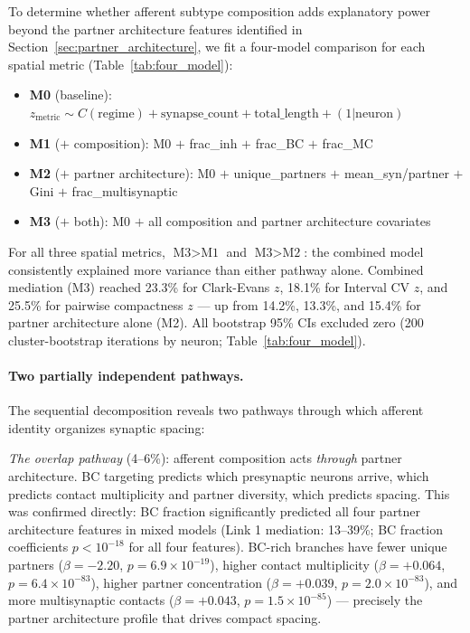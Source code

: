 \documentclass[11pt]{article}
\begin{document}
To determine whether afferent subtype composition adds explanatory power beyond the partner architecture features identified in Section~\ref{sec:partner_architecture}, we fit a four-model comparison for each spatial metric (Table~\ref{tab:four_model}):

\begin{itemize}
    \item \textbf{M0} (baseline): $z_{\text{metric}} \sim C(\text{regime}) + \text{synapse\_count} + \text{total\_length} + (1|\text{neuron})$
    \item \textbf{M1} ($+$ composition): M0 $+$ frac\_inh $+$ frac\_BC $+$ frac\_MC
    \item \textbf{M2} ($+$ partner architecture): M0 $+$ unique\_partners $+$ mean\_syn/partner $+$ Gini $+$ frac\_multisynaptic
    \item \textbf{M3} ($+$ both): M0 $+$ all composition and partner architecture covariates
\end{itemize}

For all three spatial metrics, $\text{M3} > \text{M1}$ and $\text{M3} > \text{M2}$: the combined model consistently explained more variance than either pathway alone. Combined mediation (M3) reached 23.3\% for Clark-Evans $z$, 18.1\% for Interval CV $z$, and 25.5\% for pairwise compactness $z$ --- up from 14.2\%, 13.3\%, and 15.4\% for partner architecture alone (M2). All bootstrap 95\% CIs excluded zero (200 cluster-bootstrap iterations by neuron; Table~\ref{tab:four_model}).

\paragraph{Two partially independent pathways.} The sequential decomposition reveals two pathways through which afferent identity organizes synaptic spacing:

\textit{The overlap pathway} (4--6\%): afferent composition acts \textit{through} partner architecture. BC targeting predicts which presynaptic neurons arrive, which predicts contact multiplicity and partner diversity, which predicts spacing. This was confirmed directly: BC fraction significantly predicted all four partner architecture features in mixed models (Link 1 mediation: 13--39\%; BC fraction coefficients $p < 10^{-18}$ for all four features). BC-rich branches have fewer unique partners ($\beta = -2.20$, $p = 6.9 \times 10^{-19}$), higher contact multiplicity ($\beta = +0.064$, $p = 6.4 \times 10^{-83}$), higher partner concentration ($\beta = +0.039$, $p = 2.0 \times 10^{-83}$), and more multisynaptic contacts ($\beta = +0.043$, $p = 1.5 \times 10^{-85}$) --- precisely the partner architecture profile that drives compact spacing.
\end{document}
